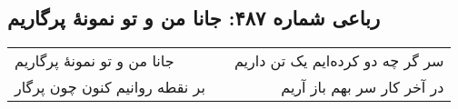 \begin{center}
\section*{رباعی شماره ۴۸۷: جانا من و تو نمونهٔ پرگاریم}
\label{sec:sh487}
\begin{longtable}{l p{0.5cm} r}
جانا من و تو نمونهٔ پرگاریم
&&
سر گر چه دو کرده‌ایم یک تن داریم
\\
بر نقطه روانیم کنون چون پرگار
&&
در آخر کار سر بهم باز آریم
\\
\end{longtable}
\end{center}
